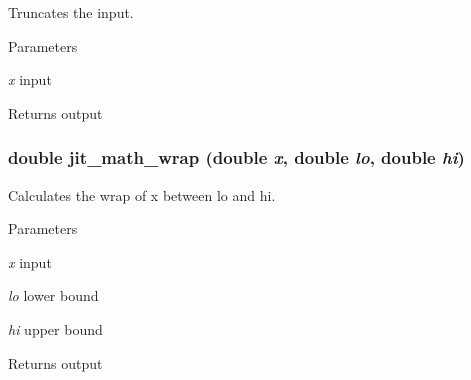 Truncates the input. 
\begin{DoxyParams}{Parameters}
\item[{\em x}]input \end{DoxyParams}
\begin{DoxyReturn}{Returns}
output 
\end{DoxyReturn}
\hypertarget{group__mathmod_ga04d9298473bc92c34c7f1e5e6154c3d1}{
\subsubsection[{jit\_\-math\_\-wrap}]{\setlength{\rightskip}{0pt plus 5cm}double jit\_\-math\_\-wrap (double {\em x}, \/  double {\em lo}, \/  double {\em hi})}}
\label{group__mathmod_ga04d9298473bc92c34c7f1e5e6154c3d1}


Calculates the wrap of x between lo and hi. 
\begin{DoxyParams}{Parameters}
\item[{\em x}]input \item[{\em lo}]lower bound \item[{\em hi}]upper bound \end{DoxyParams}
\begin{DoxyReturn}{Returns}
output 
\end{DoxyReturn}
